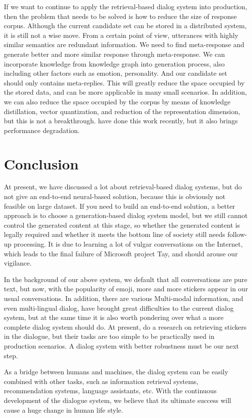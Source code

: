 \documentclass{article}
\begin{document}
If we want to continue to apply the retrieval-based dialog system into production, then the problem that needs to be solved is how to reduce the size of response corpus. Although the current candidate set can be stored in a distributed system, it is still not a wise move. From a certain point of view,  utterances with highly similar semantics are redundant information. We need to find meta-response and generate better and more similar response through meta-response. We can incorporate knowledge from knowledge graph into  generation process, also including other factors such as emotion, personality. And our candidate set should only contains meta-replies. This will greatly reduce the space occupied by the stored data, and can be more applicable in many small scenarios. In addition, we can also reduce the space occupied by the corpus by means of knowledge distillation, vector quantization, and reduction of the representation dimension, but this is not a breakthrough. \cite{lan2020ultra} have done this work recently, but it also brings performance degradation.

\section{Conclusion}

At present, we have discussed a lot about retrieval-based dialog systems, but do not give an end-to-end neural-based solution, because this is obviously not feasible on large dataset. If you need to build an end-to-end solution, a better approach is to choose a generation-based dialog system model, but we still cannot control the generated content at this stage, so whether the generated content is legally required and whether it meets the bottom line of society still needs follow-up processing. It is due to learning a lot of vulgar conversations on the Internet, which leads to the final failure of Microsoft project Tay, and should arouse our vigilance.

In the background of our above system, we default that all conversations are pure text, but now, with the popularity of emoji, more and more stickers appear in our usual conversations. In addition, there are various Multi-modal information, and even multi-lingual dialog, have brought great difficulties to the current dialog system, but at the same time it is also worth pondering over what a more complete dialog system should do. At present, \cite{gao2020learning} do a research on retrieving stickers in the dialogue, but their tasks are too simple to be practically used in production scenarios. A dialog system with better robustness must be our next step.

As a bridge between humans and machines, the dialog system can be easily combined with other tasks, such as information retrieval systems, recommendation systems, language assistants, etc. With the continuous development of the dialogue system, we believe that its ultimate success will cause a huge change in human life style.



\end{document}
